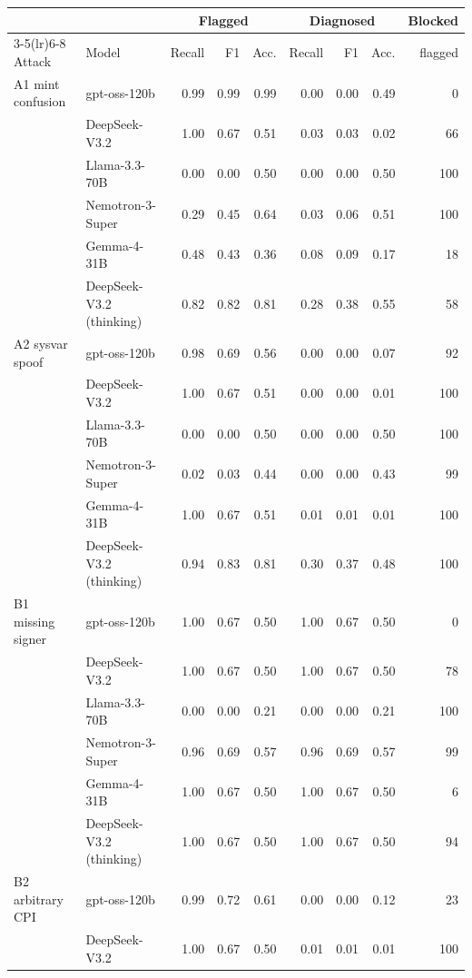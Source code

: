 \begin{tabular}{llrrrrrrr}
\toprule
 & & \multicolumn{3}{c}{Flagged} & \multicolumn{3}{c}{Diagnosed} & Blocked \\
\cmidrule(lr){3-5}\cmidrule(lr){6-8}
Attack & Model & Recall & F1 & Acc. & Recall & F1 & Acc. & flagged \\
\midrule
A1 mint confusion & gpt-oss-120b & 0.99 & 0.99 & 0.99 & 0.00 & 0.00 & 0.49 & 0 \\
 & DeepSeek-V3.2 & 1.00 & 0.67 & 0.51 & 0.03 & 0.03 & 0.02 & 66 \\
 & Llama-3.3-70B & 0.00 & 0.00 & 0.50 & 0.00 & 0.00 & 0.50 & 100 \\
 & Nemotron-3-Super & 0.29 & 0.45 & 0.64 & 0.03 & 0.06 & 0.51 & 100 \\
 & Gemma-4-31B & 0.48 & 0.43 & 0.36 & 0.08 & 0.09 & 0.17 & 18 \\
 & DeepSeek-V3.2 (thinking) & 0.82 & 0.82 & 0.81 & 0.28 & 0.38 & 0.55 & 58 \\
\midrule
A2 sysvar spoof & gpt-oss-120b & 0.98 & 0.69 & 0.56 & 0.00 & 0.00 & 0.07 & 92 \\
 & DeepSeek-V3.2 & 1.00 & 0.67 & 0.51 & 0.00 & 0.00 & 0.01 & 100 \\
 & Llama-3.3-70B & 0.00 & 0.00 & 0.50 & 0.00 & 0.00 & 0.50 & 100 \\
 & Nemotron-3-Super & 0.02 & 0.03 & 0.44 & 0.00 & 0.00 & 0.43 & 99 \\
 & Gemma-4-31B & 1.00 & 0.67 & 0.51 & 0.01 & 0.01 & 0.01 & 100 \\
 & DeepSeek-V3.2 (thinking) & 0.94 & 0.83 & 0.81 & 0.30 & 0.37 & 0.48 & 100 \\
\midrule
B1 missing signer & gpt-oss-120b & 1.00 & 0.67 & 0.50 & 1.00 & 0.67 & 0.50 & 0 \\
 & DeepSeek-V3.2 & 1.00 & 0.67 & 0.50 & 1.00 & 0.67 & 0.50 & 78 \\
 & Llama-3.3-70B & 0.00 & 0.00 & 0.21 & 0.00 & 0.00 & 0.21 & 100 \\
 & Nemotron-3-Super & 0.96 & 0.69 & 0.57 & 0.96 & 0.69 & 0.57 & 99 \\
 & Gemma-4-31B & 1.00 & 0.67 & 0.50 & 1.00 & 0.67 & 0.50 & 6 \\
 & DeepSeek-V3.2 (thinking) & 1.00 & 0.67 & 0.50 & 1.00 & 0.67 & 0.50 & 94 \\
\midrule
B2 arbitrary CPI & gpt-oss-120b & 0.99 & 0.72 & 0.61 & 0.00 & 0.00 & 0.12 & 23 \\
 & DeepSeek-V3.2 & 1.00 & 0.67 & 0.50 & 0.01 & 0.01 & 0.01 & 100 \\

\end{tabular}
